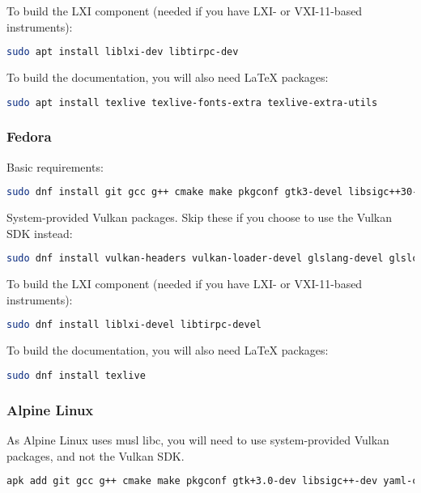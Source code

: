 \begin{enumerate}
To build the LXI component (needed if you have LXI- or VXI-11-based instruments):
\begin{lstlisting}[language=sh, numbers=none]
sudo apt install liblxi-dev libtirpc-dev
\end{lstlisting}

To build the documentation, you will also need LaTeX packages:
\begin{lstlisting}[language=sh, numbers=none]
sudo apt install texlive texlive-fonts-extra texlive-extra-utils
\end{lstlisting}


\subsubsection{Fedora}
Basic requirements:
\begin{lstlisting}[language=sh, numbers=none]
sudo dnf install git gcc g++ cmake make pkgconf gtk3-devel libsigc++30-devel yaml-cpp-devel catch-devel glfw-devel hidapi-devel lsb-release
\end{lstlisting}

System-provided Vulkan packages. Skip these if you choose to use the Vulkan SDK instead:
\begin{lstlisting}[language=sh, numbers=none]
sudo dnf install vulkan-headers vulkan-loader-devel glslang-devel glslc libshaderc-devel spirv-tools-devel
\end{lstlisting}

To build the LXI component (needed if you have LXI- or VXI-11-based instruments):
\begin{lstlisting}[language=sh, numbers=none]
sudo dnf install liblxi-devel libtirpc-devel
\end{lstlisting}

To build the documentation, you will also need LaTeX packages:
\begin{lstlisting}[language=sh, numbers=none]
sudo dnf install texlive
\end{lstlisting}

\subsubsection{Alpine Linux}

As Alpine Linux uses musl libc, you will need to use system-provided Vulkan packages, and not the Vulkan SDK.
\begin{lstlisting}[language=sh, numbers=none]
apk add git gcc g++ cmake make pkgconf gtk+3.0-dev libsigc++-dev yaml-cpp-dev catch2-3 vulkan-loader-dev glslang-dev glslang-static glfw-dev shaderc-dev spirv-tools-dev libhidapi-dev lsb-release-minimal
\end{lstlisting}


\end{enumerate}
